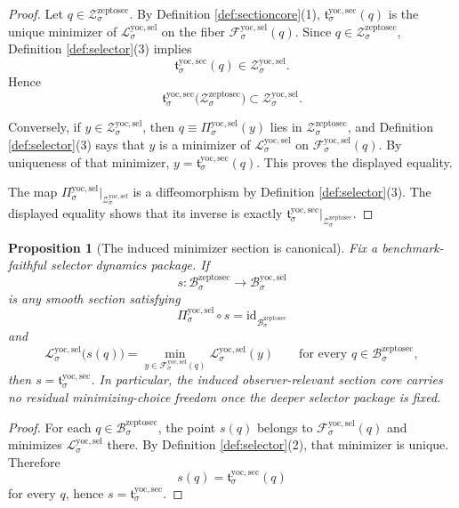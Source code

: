 \documentclass[11pt]{article}
\newcommand{\ZeptoSectionBody}[1]{\mathcal B_{#1}^{\mathrm{zeptosec}}}
\newcommand{\ZeptoSectionShell}[1]{\mathcal Z_{#1}^{\mathrm{zeptosec}}}
\newcommand{\YoctoMinSection}[1]{\mathfrak t_{#1}^{\mathrm{yoc,sec}}}
\newcommand{\YoctoSelectorBody}[1]{\mathcal B_{#1}^{\mathrm{yoc,sel}}}
\newcommand{\YoctoSelectorProj}[1]{\Pi_{#1}^{\mathrm{yoc,sel}}}
\newcommand{\YoctoSelectorFiber}[2]{\mathcal F_{#1}^{\mathrm{yoc,sel}}(#2)}
\newcommand{\YoctoSelectorFunctional}[1]{\mathscr L_{#1}^{\mathrm{yoc,sel}}}
\newcommand{\YoctoSelectorShell}[1]{\mathcal Z_{#1}^{\mathrm{yoc,sel}}}
\newtheorem{proposition}{Proposition}
\begin{document}
\begin{proof}
Let \(q\in\ZeptoSectionShell{\sigma}\). By Definition \ref{def:sectioncore}(1), \(\YoctoMinSection{\sigma}(q)\) is the unique minimizer of \(\YoctoSelectorFunctional{\sigma}\) on the fiber \(\YoctoSelectorFiber{\sigma}{q}\). Since \(q\in\ZeptoSectionShell{\sigma}\), Definition \ref{def:selector}(3) implies
\[
\YoctoMinSection{\sigma}(q)\in\YoctoSelectorShell{\sigma}.
\]
Hence
\[
\YoctoMinSection{\sigma}\bigl(\ZeptoSectionShell{\sigma}\bigr)\subset\YoctoSelectorShell{\sigma}.
\]

Conversely, if \(y\in\YoctoSelectorShell{\sigma}\), then \(q\equiv\YoctoSelectorProj{\sigma}(y)\) lies in \(\ZeptoSectionShell{\sigma}\), and Definition \ref{def:selector}(3) says that \(y\) is a minimizer of \(\YoctoSelectorFunctional{\sigma}\) on \(\YoctoSelectorFiber{\sigma}{q}\). By uniqueness of that minimizer, \(y=\YoctoMinSection{\sigma}(q)\). This proves the displayed equality.

The map \(\YoctoSelectorProj{\sigma}\big|_{\YoctoSelectorShell{\sigma}}\) is a diffeomorphism by Definition \ref{def:selector}(3). The displayed equality shows that its inverse is exactly \(\YoctoMinSection{\sigma}\big|_{\ZeptoSectionShell{\sigma}}\).
\end{proof}

\begin{proposition}[The induced minimizer section is canonical]
\label{prop:canonical}
Fix a benchmark-faithful selector dynamics package. If
\[
s:\ZeptoSectionBody{\sigma}\to\YoctoSelectorBody{\sigma}
\]
is any smooth section satisfying
\[
\YoctoSelectorProj{\sigma}\circ s
=
\mathrm{id}_{\ZeptoSectionBody{\sigma}}
\]
and
\[
\YoctoSelectorFunctional{\sigma}\bigl(s(q)\bigr)
=
\min_{y\in\YoctoSelectorFiber{\sigma}{q}}
\YoctoSelectorFunctional{\sigma}(y)
\qquad
\text{for every }
q\in\ZeptoSectionBody{\sigma},
\]
then \(s=\YoctoMinSection{\sigma}\). In particular, the induced observer-relevant section core carries no residual minimizing-choice freedom once the deeper selector package is fixed.
\end{proposition}

\begin{proof}
For each \(q\in\ZeptoSectionBody{\sigma}\), the point \(s(q)\) belongs to \(\YoctoSelectorFiber{\sigma}{q}\) and minimizes \(\YoctoSelectorFunctional{\sigma}\) there. By Definition \ref{def:selector}(2), that minimizer is unique. Therefore
\[
s(q)=\YoctoMinSection{\sigma}(q)
\]
for every \(q\), hence \(s=\YoctoMinSection{\sigma}\).
\end{proof}
\end{document}

